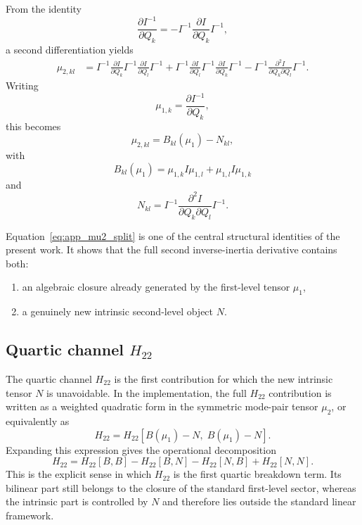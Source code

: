 \documentclass[aip,jcp,reprint,floatfix]{revtex4-2}
\begin{document}
From the identity
\begin{equation}
\frac{\partial I^{-1}}{\partial Q_k}
=
-I^{-1}\frac{\partial I}{\partial Q_k}I^{-1},
\end{equation}
a second differentiation yields
\begin{align}
\mu_{2,kl}
&=
I^{-1}\frac{\partial I}{\partial Q_k}I^{-1}\frac{\partial I}{\partial Q_l}I^{-1}
+
I^{-1}\frac{\partial I}{\partial Q_l}I^{-1}\frac{\partial I}{\partial Q_k}I^{-1}
-
I^{-1}\frac{\partial^2 I}{\partial Q_k\partial Q_l}I^{-1}.
\end{align}
Writing
\begin{equation}
\mu_{1,k}=\frac{\partial I^{-1}}{\partial Q_k},
\end{equation}
this becomes
\begin{equation}
\mu_{2,kl} = B_{kl}(\mu_1) - N_{kl},
\label{eq:app_mu2_split}
\end{equation}
with
\begin{equation}
B_{kl}(\mu_1)=\mu_{1,k}I\mu_{1,l}+\mu_{1,l}I\mu_{1,k}
\end{equation}
and
\begin{equation}
N_{kl}=I^{-1}\frac{\partial^2 I}{\partial Q_k\partial Q_l}I^{-1}.
\end{equation}

Equation~\eqref{eq:app_mu2_split} is one of the central structural identities of
the present work. It shows that the full second inverse-inertia derivative
contains both:
\begin{enumerate}
\item an algebraic closure already generated by the first-level tensor $\mu_1$,
\item a genuinely new intrinsic second-level object $N$.
\end{enumerate}

\subsection{Quartic channel \texorpdfstring{$H_{22}$}{H22}}

The quartic channel $H_{22}$ is the first contribution for which the new
intrinsic tensor $N$ is unavoidable. In the implementation, the full $H_{22}$
contribution is written as a weighted quadratic form in the symmetric mode-pair
tensor $\mu_2$, or equivalently as
\begin{equation}
H_{22} = H_{22}[B(\mu_1)-N,\;B(\mu_1)-N].
\end{equation}
Expanding this expression gives the operational decomposition
\begin{equation}
H_{22}
=
H_{22}[B,B]
-H_{22}[B,N]
-H_{22}[N,B]
+H_{22}[N,N].
\end{equation}
This is the explicit sense in which $H_{22}$ is the first quartic breakdown
term. Its bilinear part still belongs to the closure of the standard
first-level sector, whereas the intrinsic part is controlled by $N$ and
therefore lies outside the standard linear framework.
\end{document}
